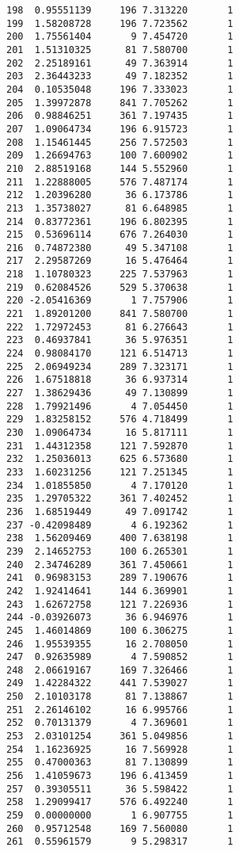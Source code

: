 \documentclass[
  letterpaper,
  DIV=11,
  numbers=noendperiod]{scrreprt}
\begin{document}
\begin{verbatim}
198  0.95551139     196 7.313220       1
199  1.58208728     196 7.723562       1
200  1.75561404       9 7.454720       1
201  1.51310325      81 7.580700       1
202  2.25189161      49 7.363914       1
203  2.36443233      49 7.182352       1
204  0.10535048     196 7.333023       1
205  1.39972878     841 7.705262       1
206  0.98846251     361 7.197435       1
207  1.09064734     196 6.915723       1
208  1.15461445     256 7.572503       1
209  1.26694763     100 7.600902       1
210  2.88519168     144 5.552960       1
211  1.22888005     576 7.487174       1
212  1.20396280      36 6.173786       1
213  1.35738027      81 6.648985       1
214  0.83772361     196 6.802395       1
215  0.53696114     676 7.264030       1
216  0.74872380      49 5.347108       1
217  2.29587269      16 5.476464       1
218  1.10780323     225 7.537963       1
219  0.62084526     529 5.370638       1
220 -2.05416369       1 7.757906       1
221  1.89201200     841 7.580700       1
222  1.72972453      81 6.276643       1
223  0.46937841      36 5.976351       1
224  0.98084170     121 6.514713       1
225  2.06949234     289 7.323171       1
226  1.67518818      36 6.937314       1
227  1.38629436      49 7.130899       1
228  1.79921496       4 7.054450       1
229  1.83258152     576 4.718499       1
230  1.09064734      16 5.817111       1
231  1.44312358     121 7.592870       1
232  1.25036013     625 6.573680       1
233  1.60231256     121 7.251345       1
234  1.01855850       4 7.170120       1
235  1.29705322     361 7.402452       1
236  1.68519449      49 7.091742       1
237 -0.42098489       4 6.192362       1
238  1.56209469     400 7.638198       1
239  2.14652753     100 6.265301       1
240  2.34746289     361 7.450661       1
241  0.96983153     289 7.190676       1
242  1.92414641     144 6.369901       1
243  1.62672758     121 7.226936       1
244 -0.03926073      36 6.946976       1
245  1.46014869     100 6.306275       1
246  1.95539355      16 2.708050       1
247  0.92635989       4 7.590852       1
248  2.06619167     169 7.326466       1
249  1.42284322     441 7.539027       1
250  2.10103178      81 7.138867       1
251  2.26146102      16 6.995766       1
252  0.70131379       4 7.369601       1
253  2.03101254     361 5.049856       1
254  1.16236925      16 7.569928       1
255  0.47000363      81 7.130899       1
256  1.41059673     196 6.413459       1
257  0.39305511      36 5.598422       1
258  1.29099417     576 6.492240       1
259  0.00000000       1 6.907755       1
260  0.95712548     169 7.560080       1
261  0.55961579       9 5.298317       1

\end{verbatim}
\end{document}
